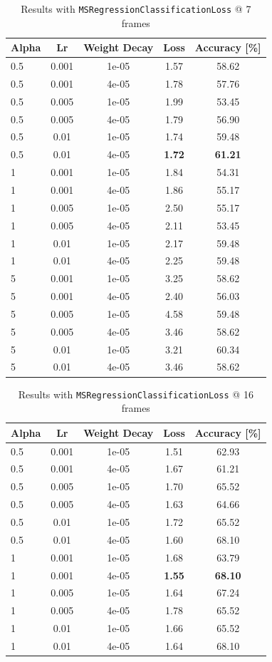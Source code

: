 \documentclass[10pt,twocolumn,letterpaper]{article}
\begin{document}
\begin{table}[h!]
	\begin{center}
		\begin{tabular}{lcc|cc}
			\textbf{Alpha} & \textbf{Lr} & \textbf{Weight Decay} & \textbf{Loss} & \textbf{Accuracy [\%]}\\
			\hline
			0.5&0.001&1e-05&1.57&58.62\\
			0.5&0.001&4e-05&1.78&57.76\\
			0.5&0.005&1e-05&1.99&53.45\\
			0.5&0.005&4e-05&1.79&56.90\\
			0.5&0.01&1e-05&1.74&59.48\\
			0.5&0.01&4e-05&\textbf{1.72}&\textbf{61.21}\\
			1&0.001&1e-05&1.84&54.31\\
			1&0.001&4e-05&1.86&55.17\\
			1&0.005&1e-05&2.50&55.17\\
			1&0.005&4e-05&2.11&53.45\\
			1&0.01&1e-05&2.17&59.48\\
			1&0.01&4e-05&2.25&59.48\\
			5&0.001&1e-05&3.25&58.62\\
			5&0.001&4e-05&2.40&56.03\\
			5&0.005&1e-05&4.58&59.48\\
			5&0.005&4e-05&3.46&58.62\\
			5&0.01&1e-05&3.21&60.34\\
			5&0.01&4e-05&3.46&58.62\\
			\hline
		\end{tabular}
	\end{center}	
	\caption{Results with \texttt{MSRegressionClassificationLoss} @ 7 frames}
\end{table}

\begin{table}[h!]
	\begin{center}
		\begin{tabular}{lcc|cc}
			\textbf{Alpha} & \textbf{Lr} & \textbf{Weight Decay} & \textbf{Loss} & \textbf{Accuracy [\%]}\\
			\hline
			0.5&0.001&1e-05&1.51&62.93\\
			0.5&0.001&4e-05&1.67&61.21\\
			0.5&0.005&1e-05&1.70&65.52\\
			0.5&0.005&4e-05&1.63&64.66\\
			0.5&0.01&1e-05&1.72&65.52\\
			0.5&0.01&4e-05&1.60&68.10\\
			1&0.001&1e-05&1.68&63.79\\
			1&0.001&4e-05&\textbf{1.55}&\textbf{68.10}\\
			1&0.005&1e-05&1.64&67.24\\
			1&0.005&4e-05&1.78&65.52\\
			1&0.01&1e-05&1.66&65.52\\
			1&0.01&4e-05&1.64&68.10\\
			\hline
		\end{tabular}
	\end{center}	
	\caption{Results with \texttt{MSRegressionClassificationLoss} @ 16 frames}
\end{table}
\end{document}
